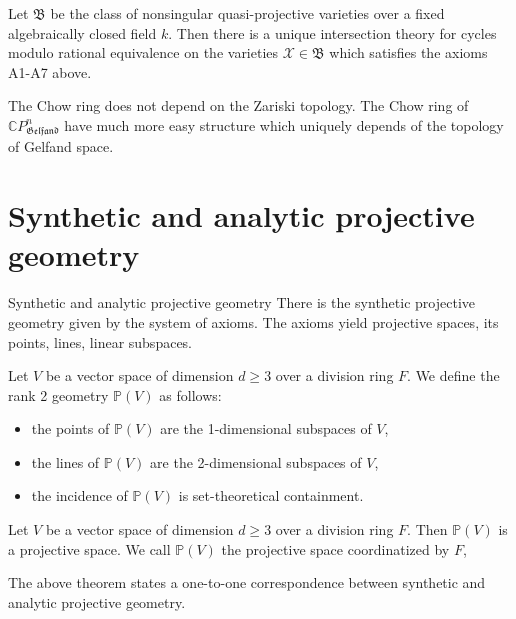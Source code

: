 \documentclass{beamer}
\theoremstyle{plain}
\newcommand{\C}{\mathbb{C}}
\newcommand{\sX}{\mathcal{X}}       %
\begin{document}
  \begin{frame}
  
  \begin{theorem}
  	Let $\mathfrak{B}$ be the class of nonsingular quasi-projective varieties over 
  	a fixed algebraically closed field $k$. Then there is a unique intersection 
  	theory for cycles modulo rational equivalence on the varieties $\sX \in \mathfrak{B}$ which 
  	satisfies the axioms A1-A7 above. 
  \end{theorem}
  
  The Chow ring does not depend on the Zariski topology. The Chow ring of  $\C P^n_{\mathfrak{Gelfand}}$ have much more easy structure which uniquely depends of the topology of Gelfand space.
  \end{frame}
  
  \section{Synthetic and analytic projective geometry}
  
  \begin{frame}
  	{\Large  Synthetic and analytic projective geometry}
  	There is the \alert{synthetic projective geometry} given by the system of axioms. The axioms yield \alert{ projective spaces}, its \alert{points}, \alert{lines}, linear subspaces. 
  	\begin{definition}
  		Let $V$ be a vector space of dimension $d \ge 3$ over a division ring
  		$F$. We define the rank 2 geometry $\mathbb{P}(V)$ as follows:
  		\begin{itemize}
  			\item the points of $\mathbb{P}(V)$ are the 1-dimensional subspaces of $V$,
  			\item the lines of $\mathbb{P}(V)$ are the 2-dimensional subspaces of $V$,
  			\item the incidence of  $\mathbb{P}(V)$ is set-theoretical containment.
  		\end{itemize}
  	\end{definition}
  	\begin{theorem}
  		Let $V$ be a vector space of dimension $d \ge 3$ over a division
  		ring $F$. Then $\mathbb{P}(V)$ is a projective space. We call $\mathbb{P}(V)$  the projective space
  		coordinatized by $F$,
  	\end{theorem}
  	The above theorem states a one-to-one correspondence between \alert{synthetic and analytic projective geometry}.
  \end{frame}
\end{document}
